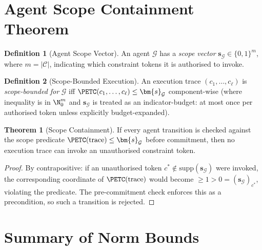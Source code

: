 \documentclass[12pt,letterpaper]{article}
\theoremstyle{definition}
\newtheorem{definition}{Definition}[section]
\newtheorem{theorem}{Theorem}[section]
\theoremstyle{remark}
\begin{document}
\section{Agent Scope Containment Theorem}
\label{sec:agent}

\begin{definition}[Agent Scope Vector]
  \label{def:scope}
  An agent \(\mathcal{G}\) has a \emph{scope vector}
  \(\bm{s}_{\mathcal{G}} \in \{0,1\}^m\), where \(m = |\mathcal{C}|\),
  indicating which constraint tokens it is authorised to invoke.
\end{definition}

\begin{definition}[Scope-Bounded Execution]
  \label{def:scope-bounded}
  An execution trace \((c_1, \ldots, c_\ell)\) is
  \emph{scope-bounded for} \(\mathcal{G}\) iff
  \(\PETC(c_1,\ldots,c_\ell) \le \bm{s}_{\mathcal{G}}\)
  component-wise (where inequality is in \(\N_0^m\) and
  \(\bm{s}_\mathcal{G}\) is treated as an indicator-budget: at most once per
  authorised token unless explicitly budget-expanded).
\end{definition}

\begin{theorem}[Scope Containment]
  \label{thm:scope}
  If every agent transition is checked against the scope predicate
  \(\PETC(\text{trace}) \le \bm{s}_{\mathcal{G}}\) before commitment, then
  no execution trace can invoke an unauthorised constraint token.
\end{theorem}

\begin{proof}
  By contrapositive: if an unauthorised token \(c^* \notin \mathrm{supp}(\bm{s}_\mathcal{G})\)
  were invoked, the corresponding coordinate of \(\PETC(\text{trace})\) would
  become \(\ge 1 > 0 = (\bm{s}_\mathcal{G})_{c^*}\), violating the predicate.
  The pre-commitment check enforces this as a precondition, so such a
  transition is rejected.
\end{proof}

\section{Summary of Norm Bounds}
\label{sec:summary}
\end{document}
